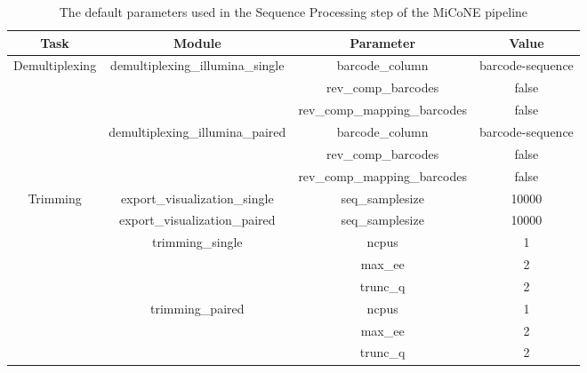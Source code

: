 \begin{table}[H]
\centering
\small
\begin{tabular}{|c|c|c|c|}
\hline
 \textbf{Task}                   & \textbf{Module}                                   & \textbf{Parameter}           & \textbf{Value}   \\ \hline
 \multirow{6}{*}{Demultiplexing} & \multirow{3}{*}{demultiplexing\_illumina\_single} & barcode\_column              & barcode-sequence \\
                                 &                                                   & rev\_comp\_barcodes          & false            \\
                                 &                                                   & rev\_comp\_mapping\_barcodes & false            \\ \cline{3-4}
                                 & \multirow{3}{*}{demultiplexing\_illumina\_paired} & barcode\_column              & barcode-sequence \\
                                 &                                                   & rev\_comp\_barcodes          & false            \\
                                 &                                                   & rev\_comp\_mapping\_barcodes & false            \\ \cline{2-4}
 \multirow{8}{*}{Trimming}       & export\_visualization\_single                     & seq\_samplesize              & 10000            \\ \cline{3-4}
                                 & export\_visualization\_paired                     & seq\_samplesize              & 10000            \\ \cline{3-4}
                                 & \multirow{3}{*}{trimming\_single}                 & ncpus                        & 1                \\
                                 &                                                   & max\_ee                      & 2                \\
                                 &                                                   & trunc\_q                     & 2                \\ \cline{3-4}
                                 & \multirow{3}{*}{trimming\_paired}                 & ncpus                        & 1                \\
                                 &                                                   & max\_ee                      & 2                \\
                                 &                                                   & trunc\_q                     & 2                \\ \hline
\end{tabular}
\caption{The default parameters used in the Sequence Processing step of the MiCoNE pipeline}
\label{tab:sp_parameters}
\end{table}

